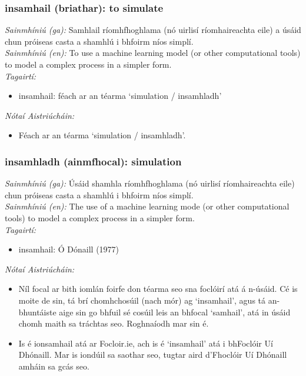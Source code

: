 \subsubsection*{insamhail (briathar): to simulate}
 \noindent \textit{Sainmhíniú (ga):} Samhlail ríomhfhoghlama (nó uirlisí ríomhaireachta eile) a úsáid chun próiseas casta a shamhlú i bhfoirm níos simplí.
\\
 \noindent \textit{Sainmhíniú (en):} To use a machine learning model (or other computational tools) to model a complex process in a simpler form.
\\
 \noindent \textit{Tagairtí:}
\begin{itemize}
	\item insamhail: féach ar an téarma `simulation / insamhladh'
\end{itemize}

 \noindent \textit{Nótaí Aistriúcháin:}
\begin{itemize}
	\item Féach ar an téarma `simulation / insamhladh'.
\end{itemize}


\subsubsection*{insamhladh (ainmfhocal): simulation}
 \noindent \textit{Sainmhíniú (ga):} Úsáid shamhla ríomhfhoghlama (nó uirlisí ríomhaireachta eile) chun próiseas casta a shamhlú i bhfoirm níos simplí.
\\
 \noindent \textit{Sainmhíniú (en):} The use of a machine learning mode (or other computational tools) to model a complex process in a simpler form.
\\
 \noindent \textit{Tagairtí:}
\begin{itemize}
	\item insamhail: Ó Dónaill (1977) \cite{odonaill}
\end{itemize}

 \noindent \textit{Nótaí Aistriúcháin:}
\begin{itemize}
	\item Níl focal ar bith iomlán foirfe don téarma seo sna foclóirí atá á n-úsáid. Cé is moite de sin, tá brí chomhchosúil (nach mór) ag `insamhail', agus tá an-bhuntáiste aige sin go bhfuil sé cosúil leis an bhfocal `samhail', atá in úsáid chomh maith sa tráchtas seo. Roghnaíodh mar sin é.
	\item Is é ionsamhail atá ar Focloir.ie, ach is é `insamhail' atá i bhFoclóir Uí Dhónaill. Mar is iondúil sa saothar seo, tugtar aird d'Fhoclóir Uí Dhónaill amháin sa gcás seo.
\end{itemize}


